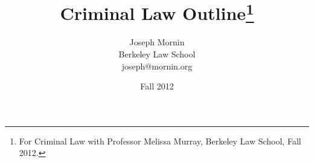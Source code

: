\documentclass[letterpaper,titlepage]{article}
\begin{document}
\title{Criminal Law Outline\footnote{For Criminal Law with Professor Melissa Murray, Berkeley Law School, Fall 2012.}}
\author{Joseph Mornin\\Berkeley Law School\\joseph@mornin.org}
\date{Fall 2012}
\maketitle
\tableofcontents
\pagebreak


\end{document}

